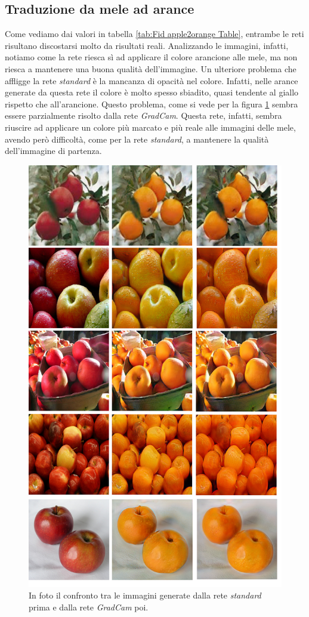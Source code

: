 \subsection{Traduzione da mele ad arance}
Come vediamo dai valori in tabella \ref{tab:Fid apple2orange Table}, entrambe le reti risultano discostarsi molto da risultati reali. Analizzando le immagini, infatti, notiamo come la rete riesca sì ad applicare il colore arancione alle mele, ma non riesca a mantenere una buona qualità dell'immagine. Un ulteriore problema che affligge la rete \emph{standard} è la mancanza di opacità nel colore. Infatti, nelle arance generate da questa rete il colore è molto spesso sbiadito, quasi tendente al giallo rispetto che all'arancione. Questo problema, come si vede per la figura \ref{fig:Confronto tra tutte le reti orange} sembra essere parzialmente risolto dalla rete \emph{GradCam}. Questa rete, infatti, sembra riuscire ad applicare un colore più marcato e più reale alle immagini delle mele, avendo però difficoltà, come per la rete \emph{standard}, a mantenere la qualità dell'immagine di partenza.

\begin{figure}[H]
\begin{center}
\includegraphics[width=0.6\columnwidth]{images/merge orange.png}
\end{center}
\caption{In foto il confronto tra le immagini generate dalla rete \emph{standard} prima e dalla rete \emph{GradCam} poi.}
\label{fig:Confronto tra tutte le reti orange}
\end{figure}  


